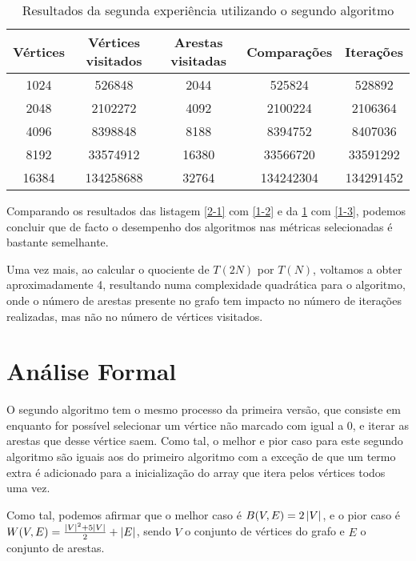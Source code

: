 \begin{table}[H]
	\centering
	\begin{tabular}{| c || c | c | c | c |}
		\hline
		Vértices & Vértices visitados & Arestas visitadas & Comparações & Iterações \\
		\hline\hline
		1024     & 526848             & 2044              & 525824      & 528892    \\
		2048     & 2102272            & 4092              & 2100224     & 2106364   \\
		4096     & 8398848            & 8188              & 8394752     & 8407036   \\
		8192     & 33574912           & 16380             & 33566720    & 33591292  \\
		16384    & 134258688          & 32764             & 134242304   & 134291452 \\
		\hline
	\end{tabular}
	\caption{Resultados da segunda experiência utilizando o segundo algoritmo}
	\label{2-2}
\end{table}

Comparando os resultados das listagem \ref{2-1} com \ref{1-2} e da \ref{2-2} com
\ref{1-3}, podemos concluir que de facto o desempenho dos algoritmos nas
métricas selecionadas é bastante semelhante.

Uma vez mais, ao calcular o quociente de $T(2N)$ por $T(N)$, voltamos a obter
aproximadamente 4, resultando numa complexidade quadrática para o algoritmo,
onde o número de arestas presente no grafo tem impacto no número de iterações
realizadas, mas não no número de vértices visitados.

\section{Análise Formal}

O segundo algoritmo tem o mesmo processo da primeira versão, que consiste em
enquanto for possível selecionar um vértice não marcado com 
igual a 0, e iterar as arestas que desse vértice saem. Como tal, o melhor e pior
caso para este segundo algoritmo são iguais aos do primeiro algoritmo com a
exceção de que um termo extra é adicionado para a inicialização do array que
itera pelos vértices todos uma vez.

Como tal, podemos afirmar que o melhor caso é $B(V, E) = 2\left\lvert V \right\rvert$, e o pior
caso é $W(V,E) = \frac{\left\lvert V \right\rvert^2 + 5\left\lvert V \right\rvert}{2} + \left\lvert E \right\rvert$, sendo $V$ o
conjunto de vértices do grafo e $E$ o conjunto de arestas. \\
